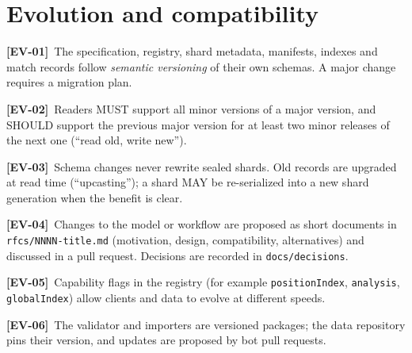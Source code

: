 \documentclass[11pt,a4paper]{article}
\newcommand{\kw}[1]{\textit{#1}\index{#1}}
\newcommand{\req}[2]{\par\smallskip\noindent\hypertarget{#1}{}\textbf{[#1]}\ #2\par}
\begin{document}
\section{Evolution and compatibility}\label{sec:evolution}
\req{EV-01}{The specification, registry, shard metadata, manifests, indexes and match records follow \kw{semantic versioning} of their own schemas. A major change requires a migration plan.}
\req{EV-02}{Readers MUST support all minor versions of a major version, and SHOULD support the previous major version for at least two minor releases of the next one (``read old, write new'').}
\req{EV-03}{Schema changes never rewrite sealed shards. Old records are upgraded at read time (``upcasting''); a shard MAY be re-serialized into a new shard generation when the benefit is clear.}
\req{EV-04}{Changes to the model or workflow are proposed as short documents in \texttt{rfcs/NNNN-title.md} (motivation, design, compatibility, alternatives) and discussed in a pull request. Decisions are recorded in \texttt{docs/decisions}.}
\req{EV-05}{Capability flags in the registry (for example \texttt{positionIndex}, \texttt{analysis}, \texttt{globalIndex}) allow clients and data to evolve at different speeds.}
\req{EV-06}{The validator and importers are versioned packages; the data repository pins their version, and updates are proposed by bot pull requests.}

\end{document}
